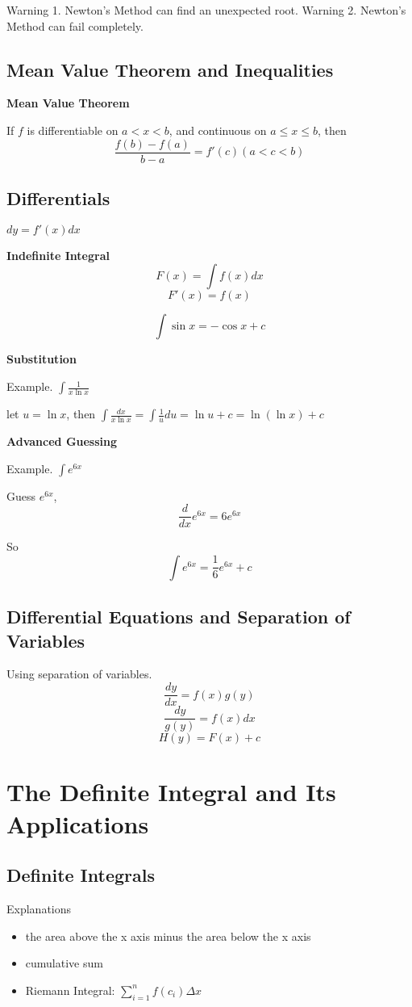\documentclass{article}
\begin{document}
Warning 1. Newton's Method can find an unexpected root.
Warning 2. Newton's Method can fail completely.

\subsection{Mean Value Theorem and Inequalities}
\textbf{Mean Value Theorem}

If $f$ is differentiable on $a < x < b$, and continuous on $a \leq x \leq b$, then
$$\frac{f(b)-f(a)}{b-a} = f'(c) (a<c<b)$$

\subsection{Differentials}
$dy = f'(x)dx$

\textbf{Indefinite Integral}
$$F(x) = \int f(x)dx$$
$$F'(x) = f(x)$$

$$\int \sin x = -\cos x + c$$

\textbf{Substitution}

Example. $\int \frac{1}{x\ln x}$

let $u = \ln x$, then $\int \frac{dx}{x\ln x} = \int \frac{1}{u}du = \ln u + c = \ln (\ln x) + c$

\textbf{Advanced Guessing}

Example. $\int e^{6x}$

Guess $e^{6x}$,
$$\frac{d}{dx}e^{6x} = 6e^{6x}$$

So $$\int e^{6x} = \frac{1}{6}e^{6x} + c$$

\subsection{Differential Equations and Separation of Variables}

Using separation of variables.
$$\frac{dy}{dx} = f(x)g(y)$$
$$\frac{dy}{g(y)} = f(x)dx$$
$$H(y) = F(x) + c$$

\section{The Definite Integral and Its Applications}
\subsection{Definite Integrals}

Explanations
\begin{itemize}
  \item the area above the x axis minus the area below the x axis
  \item cumulative sum
  \item Riemann Integral: $\sum\limits_{i=1}^{n}f(c_i)\Delta x$
\end{itemize}
\end{document}
